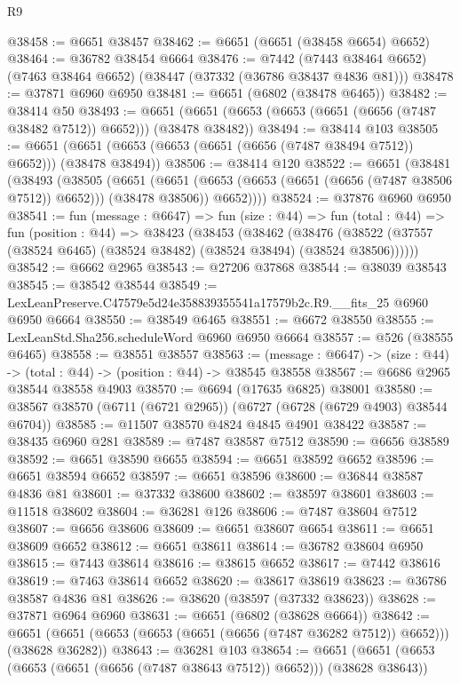 \begin{lexlean}{R9}
\begin{coremodule}
@38458 := @6651 @38457
@38462 := @6651 (@6651 (@38458 @6654) @6652)
@38464 := @36782 @38454 @6664
@38476 := @7442
    (@7443 @38464 @6652)
    (@7463 @38464 @6652)
    (@38447 (@37332 (@36786 @38437 @4836 @81)))
@38478 := @37871 @6960 @6950
@38481 := @6651 (@6802 (@38478 @6465))
@38482 := @38414 @50
@38493 := @6651 (@6651 (@6653 (@6653 (@6651 (@6656 (@7487 @38482 @7512)) @6652))) (@38478 @38482))
@38494 := @38414 @103
@38505 := @6651 (@6651 (@6653 (@6653 (@6651 (@6656 (@7487 @38494 @7512)) @6652))) (@38478 @38494))
@38506 := @38414 @120
@38522 := @6651
    (@38481
      (@38493
        (@38505
          (@6651
            (@6651 (@6653 (@6653 (@6651 (@6656 (@7487 @38506 @7512)) @6652))) (@38478 @38506))
            @6652))))
@38524 := @37876 @6960 @6950
@38541 := fun (message : @6647) =>
  fun (size : @44) =>
  fun (total : @44) =>
  fun (position : @44) =>
  @38423
    (@38453
      (@38462
        (@38476 (@38522 (@37557 (@38524 @6465) (@38524 @38482) (@38524 @38494) (@38524 @38506))))))
@38542 := @6662 @2965
@38543 := @27206 @37868
@38544 := @38039 @38543
@38545 := @38542 @38544
@38549 := LexLeanPreserve.C47579e5d24e358839355541a17579b2c.R9.__fits_25 @6960 @6950 @6664
@38550 := @38549 @6465
@38551 := @6672 @38550
@38555 := LexLeanStd.Sha256.scheduleWord @6960 @6950 @6664
@38557 := @526 (@38555 @6465)
@38558 := @38551 @38557
@38563 := (message : @6647) -> (size : @44) -> (total : @44) -> (position : @44) -> @38545 @38558
@38567 := @6686 @2965 @38544 @38558 @4903
@38570 := @6694 (@17635 @6825) @38001
@38580 := @38567 @38570 (@6711 (@6721 @2965)) (@6727 (@6728 (@6729 @4903) @38544 @6704))
@38585 := @11507 @38570 @4824 @4845 @4901 @38422
@38587 := @38435 @6960 @281
@38589 := @7487 @38587 @7512
@38590 := @6656 @38589
@38592 := @6651 @38590 @6655
@38594 := @6651 @38592 @6652
@38596 := @6651 @38594 @6652
@38597 := @6651 @38596
@38600 := @36844 @38587 @4836 @81
@38601 := @37332 @38600
@38602 := @38597 @38601
@38603 := @11518 @38602
@38604 := @36281 @126
@38606 := @7487 @38604 @7512
@38607 := @6656 @38606
@38609 := @6651 @38607 @6654
@38611 := @6651 @38609 @6652
@38612 := @6651 @38611
@38614 := @36782 @38604 @6950
@38615 := @7443 @38614
@38616 := @38615 @6652
@38617 := @7442 @38616
@38619 := @7463 @38614 @6652
@38620 := @38617 @38619
@38623 := @36786 @38587 @4836 @81
@38626 := @38620 (@38597 (@37332 @38623))
@38628 := @37871 @6964 @6960
@38631 := @6651 (@6802 (@38628 @6664))
@38642 := @6651 (@6651 (@6653 (@6653 (@6651 (@6656 (@7487 @36282 @7512)) @6652))) (@38628 @36282))
@38643 := @36281 @103
@38654 := @6651 (@6651 (@6653 (@6653 (@6651 (@6656 (@7487 @38643 @7512)) @6652))) (@38628 @38643))

\end{coremodule}
\end{lexlean}

